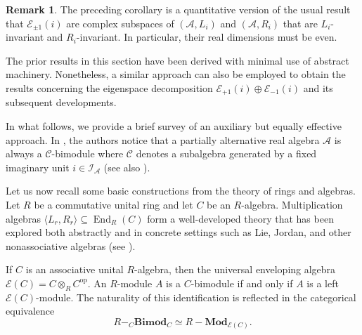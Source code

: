 \documentclass{amsart}
\theoremstyle{definition}
\newtheorem{remark}{Remark}
\theoremstyle{plain}
\begin{document}
\begin{remark}
The preceding corollary is a quantitative version of the usual result that  $\mathcal{E}_{\pm1}(i)$ are complex subspaces of $(\mathcal{A},L_i)$ and $(\mathcal{A},R_i)$ that are $L_i$-invariant and $R_i$-invariant. In particular, their real dimensions must be even.
\end{remark}

The prior results in this section have been derived with minimal use of abstract machinery. Nonetheless, a similar approach can also be employed to obtain the results concerning the eigenspace decomposition $\mathcal{E}_{+1}(i)\oplus \mathcal{E}_{-1}(i)$ and its subsequent developments. 

In what follows, we provide a brief survey of an auxiliary but equally effective approach. In \cite{HNT}, the authors notice that a partially alternative real algebra $\mathcal{A}$ is always a $\mathcal{C}$-bimodule  where $\mathcal{C}$ denotes a subalgebra generated by a fixed imaginary unit $i\in\mathcal{I_A}$ (see also \cite{AHK}).

Let us now recall some basic constructions from the theory of rings and algebras. Let $R$ be a commutative unital ring and let $C$ be an $R$-algebra. Multiplication algebras $\langle L_r,R_r\rangle\subseteq\operatorname{End}_R(C)$  form a well-developed theory that has been explored both abstractly and in concrete settings such as Lie, Jordan, and other nonassociative algebras (see \cite{Schafer, KS}).

If $C$ is an associative unital $R$-algebra, then the universal enveloping algebra  $\mathcal{E}(C) = C \otimes_R C^{\mathrm{op}}$.  An $R$-module $A$ is a $C$-bimodule if and only if $A$ is a left $\mathcal E(C)$-module. The naturality of this identification is reflected in the categorical equivalence $$R-_C\mathbf{Bimod}_C\simeq R-\mathbf{Mod}_{\mathcal{E}(C)}.$$
\end{document}
